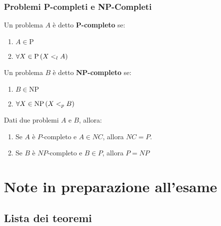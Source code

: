 \documentclass{lectures}
\begin{document}
\section{Problemi P-completi e NP-Completi}
\begin{multicols}{2}
\begin{definition}[P-Completo]
    Un problema \(A\) è detto \textbf{P-completo} se:
    \begin{enumerate}
        \item \(A \in \text{P}\)
        \item \(\forall X \in \text{P} \left(X <_l A\right)\)
    \end{enumerate}
\end{definition}
\begin{definition}[NP-Completo]
    Un problema \(B\) è detto \textbf{NP-completo} se:
    \begin{enumerate}
        \item \(B \in \text{NP}\)
        \item \(\forall X \in \text{NP} \left(X <_p B\right)\)
    \end{enumerate}
\end{definition}
\begin{theorem}
    Dati due problemi \(A\) e \(B\), allora:
    \begin{enumerate}
        \item Se \(A\) è \(P\)-completo e \(A \in NC\), allora \(NC = P\).
        \item Se \(B\) è \(NP\)-completo e \(B \in P\), allora \(P = NP\) 
    \end{enumerate}
\end{theorem}
\end{multicols}

\part{Note in preparazione all'esame}
\chapter{Lista dei teoremi}
\end{document}
